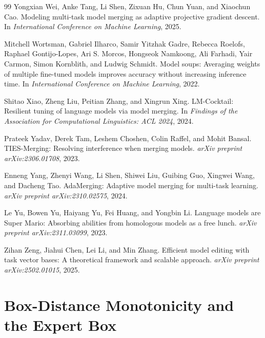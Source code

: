 \documentclass{article} %
\begin{document}
\begin{thebibliography}{99}
Yongxian Wei, Anke Tang, Li Shen, Zixuan Hu, Chun Yuan, and Xiaochun Cao.
\newblock Modeling multi-task model merging as adaptive projective gradient descent.
\newblock In \emph{International Conference on Machine Learning}, 2025.

Mitchell Wortsman, Gabriel Ilharco, Samir Yitzhak Gadre, Rebecca Roelofs, Raphael Gontijo-Lopes, Ari S. Morcos, Hongseok Namkoong, Ali Farhadi, Yair Carmon, Simon Kornblith, and Ludwig Schmidt.
\newblock Model soups: Averaging weights of multiple fine-tuned models improves accuracy without increasing inference time.
\newblock In \emph{International Conference on Machine Learning}, 2022.

Shitao Xiao, Zheng Liu, Peitian Zhang, and Xingrun Xing.
\newblock LM-Cocktail: Resilient tuning of language models via model merging.
\newblock In \emph{Findings of the Association for Computational Linguistics: ACL 2024}, 2024.

Prateek Yadav, Derek Tam, Leshem Choshen, Colin Raffel, and Mohit Bansal.
\newblock TIES-Merging: Resolving interference when merging models.
\newblock \emph{arXiv preprint arXiv:2306.01708}, 2023.

Enneng Yang, Zhenyi Wang, Li Shen, Shiwei Liu, Guibing Guo, Xingwei Wang, and Dacheng Tao.
\newblock AdaMerging: Adaptive model merging for multi-task learning.
\newblock \emph{arXiv preprint arXiv:2310.02575}, 2024.

Le Yu, Bowen Yu, Haiyang Yu, Fei Huang, and Yongbin Li.
\newblock Language models are Super Mario: Absorbing abilities from homologous models as a free lunch.
\newblock \emph{arXiv preprint arXiv:2311.03099}, 2023.

Zihan Zeng, Jiahui Chen, Lei Li, and Min Zhang.
\newblock Efficient model editing with task vector bases: A theoretical framework and scalable approach.
\newblock \emph{arXiv preprint arXiv:2502.01015}, 2025.

\end{thebibliography}


\appendix

\section{Box-Distance Monotonicity and the Expert Box}
\label{app:box-theory}
\end{document}
